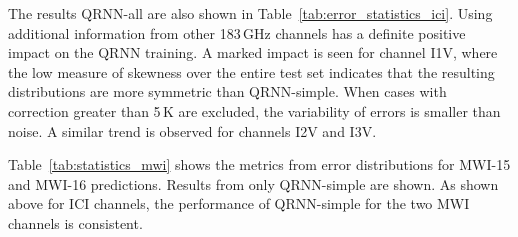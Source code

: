 \documentclass[amt, manuscript]{copernicus}
\begin{document}
The results QRNN-all are also shown in Table~\ref{tab:error_statistics_ici}. Using additional information from other 183\,GHz channels has a definite positive impact on the QRNN training. A marked impact is seen for channel I1V, where the low measure of skewness over the entire test set indicates that the resulting distributions are more symmetric than QRNN-simple. When cases with correction greater than 5\,K are excluded, the variability of errors is smaller than noise. A similar trend is observed for channels I2V and I3V.  

Table~\ref{tab:statistics_mwi} shows the metrics from error distributions for MWI-15 and MWI-16 predictions. Results from only QRNN-simple are shown. As shown above for ICI channels, the performance of QRNN-simple for the two MWI channels is consistent. 
 
\end{document}

